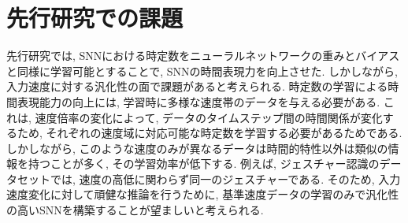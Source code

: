 \section{先行研究での課題}
先行研究では, SNNにおける時定数をニューラルネットワークの重みとバイアスと同様に学習可能とすることで, SNNの時間表現力を向上させた.
しかしながら, 入力速度に対する汎化性の面で課題があると考えられる.
時定数の学習による時間表現能力の向上には, 学習時に多様な速度帯のデータを与える必要がある.
これは, 速度倍率の変化によって, データのタイムステップ間の時間関係が変化するため, それぞれの速度域に対応可能な時定数を学習する必要があるためである.
しかしながら, このような速度のみが異なるデータは時間的特性以外は類似の情報を持つことが多く, その学習効率が低下する.
例えば, ジェスチャー認識のデータセットでは, 速度の高低に関わらず同一のジェスチャーである.
そのため, 入力速度変化に対して頑健な推論を行うために, 基準速度データの学習のみで汎化性の高いSNNを構築することが望ましいと考えられる.
